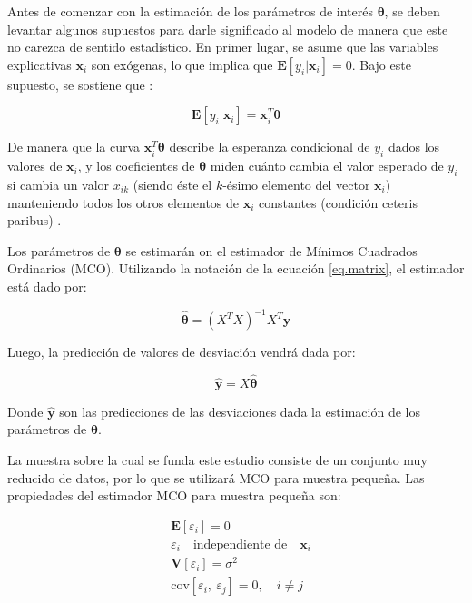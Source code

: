 Antes de comenzar con la estimación de los parámetros de interés $\bm{\theta}$, se deben levantar algunos supuestos para darle significado al modelo de manera que este no carezca de sentido estadístico. En primer lugar, se asume que las variables explicativas $\bm{x}_i$ son exógenas, lo que implica que $\bm{E}[y_i|\bm{x}_i]=0$. Bajo este supuesto, se sostiene que :

\begin{equation}
    \label{eq.e-xb}
    \bm{E}[y_i|\bm{x}_i] = \bm{x}_i^T\bm{\theta}
\end{equation}

De manera que la curva $\bm{x}_i^T\bm{\theta}$ describe la esperanza condicional de $y_i$ dados los valores de $\bm{x}_i$, y los coeficientes de $\bm{\theta}$ miden cuánto cambia el valor esperado de $y_i$ si cambia un valor $x_{ik}$ (siendo éste el $k$-ésimo elemento del vector $\bm{x}_i$) manteniendo todos los otros elementos de $\bm{x}_i$ constantes (condición ceteris paribus) \cite{verbeek}.

Los parámetros de $\bm{\theta}$ se estimarán on el estimador de Mínimos Cuadrados Ordinarios (MCO). Utilizando la notación de la ecuación \eqref{eq.matrix}, el estimador está dado por:

\begin{equation}
    \label{eq.mco}
    \bm{\hat\theta} = \left( X^TX\right)^{-1}X^T\bm{y}
\end{equation}

Luego, la predicción de valores de desviación vendrá dada por:

\begin{equation}
    \label{eq.predicc}
    \hat{\bm{y}} = X\hat{\bm{\theta}}
\end{equation}

Donde $\hat{\bm{y}}$ son las predicciones de las desviaciones dada la estimación de los parámetros de $\bm{\theta}$.  

La muestra sobre la cual se funda este estudio consiste de un conjunto muy reducido de datos, por lo que se utilizará MCO para muestra pequeña. Las propiedades del estimador MCO para muestra pequeña son:

\begin{align}
    & \label{eq.s1} \bm{E}[\varepsilon_i] = 0\\
    & \label{eq.s2} \varepsilon_i\quad\text{independiente de}\quad \bm{x}_i\\
    & \label{eq.s3} \bm{V}[\varepsilon_i]=\sigma^2 \\
    & \label{eq.s4} \text{cov}[\varepsilon_i,~\varepsilon_j] = 0,\quad i\neq j
\end{align}

